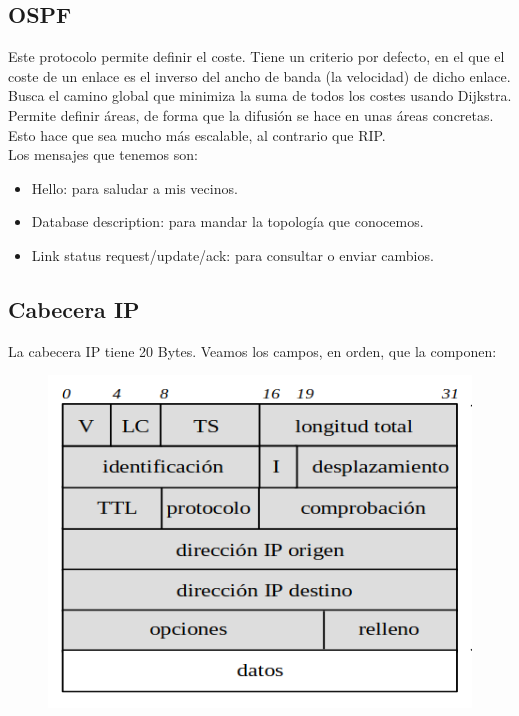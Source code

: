 \subsection{\acrfull{OSPF}}

Este protocolo permite definir el coste. Tiene un criterio por defecto, en el que el coste de un enlace es el inverso del ancho de banda (la velocidad) de dicho enlace. Busca el camino global que minimiza la suma de todos los costes usando Dijkstra. \\

Permite definir áreas, de forma que la difusión se hace en unas áreas concretas. Esto hace que sea mucho más escalable, al contrario que \acrshort{RIP}.\\

\noindent
Los mensajes que tenemos son:

\begin{itemize}
    \item Hello: para saludar a mis vecinos.
    \item Database description: para mandar la topología que conocemos. 
    \item Link status request/update/ack: para consultar o enviar cambios.
\end{itemize}


\subsection{Cabecera IP}
La cabecera IP tiene 20 Bytes. Veamos los campos, en orden, que la componen:
\begin{figure}[H]
    \centering
    \includegraphics[width=0.4\linewidth]{./images/cabecera-ip.png}
\end{figure}

